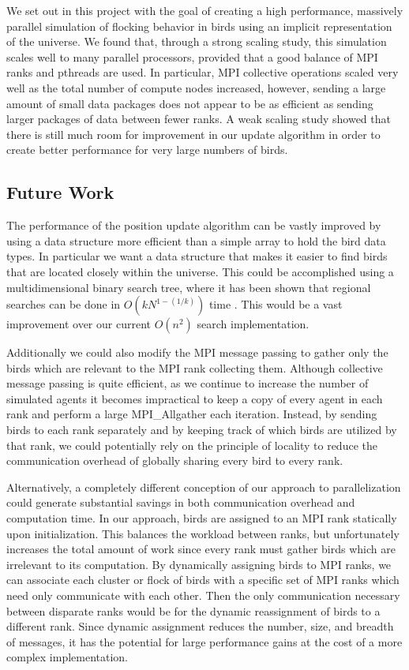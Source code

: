 We set out in this project with the goal of creating a high performance,
massively parallel simulation of flocking behavior in birds using an implicit
representation of the universe. We found that, through a strong scaling study,
this simulation scales well to many parallel processors, provided that a good
balance of MPI ranks and pthreads are used. In particular, MPI collective
operations scaled very well as the total number of compute nodes increased,
however, sending a large amount of small data packages does not appear to be
as efficient as sending larger packages of data between fewer ranks. A weak
scaling study showed that there is still much room for improvement in our update
algorithm in order to create better performance for very large numbers of birds.

\subsection*{Future Work}
The performance of the position update algorithm can be vastly
improved by using a data structure more efficient than a simple array
to hold the bird data types. In particular we want a data structure
that makes it easier to find birds that are located closely within the
universe. This could be accomplished using a multidimensional binary
search tree, where it has been shown that regional searches can be
done in \(O(kN^{1-(1/k)})\) time \cite{Lee}. This would be a vast
improvement over our current \(O(n^2)\) search implementation.

Additionally we could also modify the MPI message passing to gather
only the birds which are relevant to the MPI rank collecting
them. Although collective message passing is quite efficient, as we
continue to increase the number of simulated agents it becomes
impractical to keep a copy of every agent in each rank and perform a
large MPI\_Allgather each iteration. Instead, by sending birds to each
rank separately and by keeping track of which birds are utilized by
that rank, we could potentially rely on the principle of locality to
reduce the communication overhead of globally sharing every bird to
every rank.

Alternatively, a completely different conception of our approach to
parallelization could generate substantial savings in both
communication overhead and computation time. In our approach, birds
are assigned to an MPI rank statically upon initialization. This
balances the workload between ranks, but unfortunately increases the
total amount of work since every rank must gather birds which are
irrelevant to its computation. By dynamically assigning birds to MPI
ranks, we can associate each cluster or flock of birds with a specific
set of MPI ranks which need only communicate with each other. Then the
only communication necessary between disparate ranks would be for the
dynamic reassignment of birds to a different rank. Since dynamic
assignment reduces the number, size, and breadth of messages, it has
the potential for large performance gains at the cost of a more
complex implementation.

